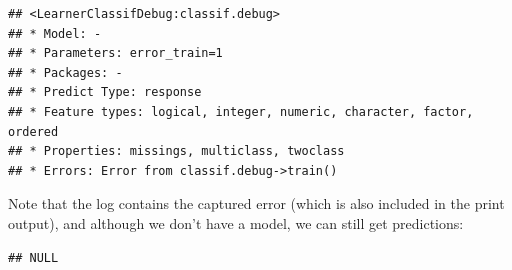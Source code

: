 \documentclass[
]{scrbook}
\newenvironment{Shaded}{\begin{snugshade}}{\end{snugshade}}
\newcommand{\AttributeTok}[1]{\textcolor[rgb]{0.77,0.63,0.00}{#1}}
\newcommand{\DecValTok}[1]{\textcolor[rgb]{0.00,0.00,0.81}{#1}}
\newcommand{\FunctionTok}[1]{\textcolor[rgb]{0.00,0.00,0.00}{#1}}
\newcommand{\NormalTok}[1]{#1}
\newcommand{\OtherTok}[1]{\textcolor[rgb]{0.56,0.35,0.01}{#1}}
\newcommand{\SpecialCharTok}[1]{\textcolor[rgb]{0.00,0.00,0.00}{#1}}
\newcommand{\StringTok}[1]{\textcolor[rgb]{0.31,0.60,0.02}{#1}}
\renewenvironment{Shaded} {\begin{snugshade}\small} {\end{snugshade}}
\begin{document}
\begin{Shaded}
\end{Shaded}

\begin{verbatim}
## <LearnerClassifDebug:classif.debug>
## * Model: -
## * Parameters: error_train=1
## * Packages: -
## * Predict Type: response
## * Feature types: logical, integer, numeric, character, factor, ordered
## * Properties: missings, multiclass, twoclass
## * Errors: Error from classif.debug->train()
\end{verbatim}

Note that the log contains the captured error (which is also included in the print output), and although we don't have a model, we can still get predictions:

\begin{Shaded}
\end{Shaded}

\begin{verbatim}
## NULL
\end{verbatim}

\begin{Shaded}
\end{Shaded}
\end{document}
